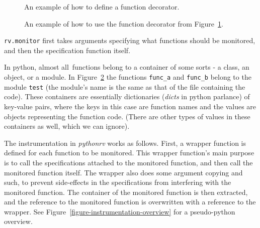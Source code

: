 \documentclass[a4paper,11pt]{kth-mag}
\begin{document}
\begin{figure}[h!]
	\begin{center}
	\begin{minipage}{0.7\textwidth}
	
	\end{minipage}
	\end{center}

	\caption{An example of how to define a function decorator.}
	\label{figure-function-decorator}
\end{figure}

\begin{figure}[h!]
	\begin{center}
	\begin{minipage}{0.7\textwidth}
	
	\end{minipage}
	\end{center}

	\caption{An example of how to use the function decorator from
	Figure~\ref{figure-function-decorator}.}
	\label{figure-function-decorator-usages}
\end{figure}

\texttt{rv.monitor} first takes arguments specifying what functions should be
monitored, and then the specification function itself.

In python, almost all\footnotemark\ functions belong to a container of some
sorts - a class, an object, or a module. In
Figure~\ref{figure-function-decorator-usages} the functions \texttt{func\_a}
and \texttt{func\_b} belong to the module \texttt{test} (the module's name is
the same as that of the file containing the code). These containers are
essentially dictionaries (\textit{dicts} in python parlance) of key-value
pairs, where the keys in this case are function names and the values are
objects representing the function code. (There are other types of values in
these containers as well, which we can ignore).


The instrumentation in \textit{pythonrv} works as follows. First, a wrapper
function is defined for each function to be monitored. This wrapper function's
main purpose is to call the specifications attached to the monitored function,
and then call the monitored function itself. The wrapper also does some
argument copying and such, to prevent side-effects in the specifications from
interfering with the monitored function. The container of the monitored
function is then extracted, and the reference to the monitored function is
overwritten with a reference to the wrapper. See
Figure~\ref{figure-instrumentation-overview} for a pseudo-python overview.
\end{document}
